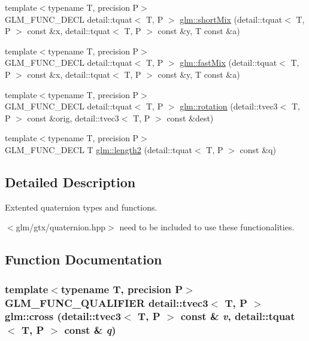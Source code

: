 \begin{CompactItemize}
{\footnotesize template$<$typename T, precision P$>$ }\\GLM\_\-FUNC\_\-DECL detail::tquat$<$ T, P $>$ \hyperlink{group__gtx__quaternion_g1d83d29dc8f5870d70d2833c64be777c}{glm::shortMix} (detail::tquat$<$ T, P $>$ const \&x, detail::tquat$<$ T, P $>$ const \&y, T const \&a)
\item 
{\footnotesize template$<$typename T, precision P$>$ }\\GLM\_\-FUNC\_\-DECL detail::tquat$<$ T, P $>$ \hyperlink{group__gtx__quaternion_g0538872e0a23bc7ba865700756c1a3a7}{glm::fastMix} (detail::tquat$<$ T, P $>$ const \&x, detail::tquat$<$ T, P $>$ const \&y, T const \&a)
\item 
{\footnotesize template$<$typename T, precision P$>$ }\\GLM\_\-FUNC\_\-DECL detail::tquat$<$ T, P $>$ \hyperlink{group__gtx__quaternion_gf7a15242ef69e5c997df231b28b92cef}{glm::rotation} (detail::tvec3$<$ T, P $>$ const \&orig, detail::tvec3$<$ T, P $>$ const \&dest)
\item 
{\footnotesize template$<$typename T, precision P$>$ }\\GLM\_\-FUNC\_\-DECL T \hyperlink{group__gtx__quaternion_ge0ff959e757f5feba0bd375658673d0d}{glm::length2} (detail::tquat$<$ T, P $>$ const \&q)
\end{CompactItemize}


\subsection{Detailed Description}
Extented quaternion types and functions. 

$<$glm/gtx/quaternion.hpp$>$ need to be included to use these functionalities. 

\subsection{Function Documentation}
\hypertarget{group__gtx__quaternion_gd81a2ea5c1048d8101ce2876eb6569f7}{
\subsubsection[cross]{\setlength{\rightskip}{0pt plus 5cm}template$<$typename T, precision P$>$ GLM\_\-FUNC\_\-QUALIFIER detail::tvec3$<$ T, P $>$ glm::cross (detail::tvec3$<$ T, P $>$ const \& {\em v}, \/  detail::tquat$<$ T, P $>$ const \& {\em q})}}
\label{group__gtx__quaternion_gd81a2ea5c1048d8101ce2876eb6569f7}


